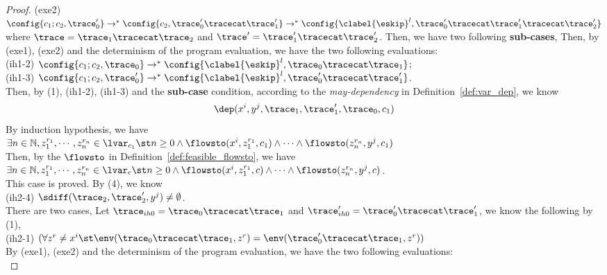 \begin{proof}
  (exe2) $\config{{c_1}; {c_2}, \trace_0'}
  \rightarrow^{*} \config{c_2, \trace_0'  \tracecat \trace_1'}
  \rightarrow^{*} \config{\clabel{\eskip}^l, \trace_0'  \tracecat \trace_1' \tracecat \trace_2'}$ 
  \\
  where $\trace = \trace_1 \tracecat \trace_2$ 
  and $\trace' = \trace_1' \tracecat \trace_2'$.
Then, we have two following \textbf{sub-cases},
Then, by (exe1), (exe2) and the determinism of the program evaluation, we have the two following evaluations:
\\
(ih1-2) $\config{c_1;c_2 , \trace_0} 
\rightarrow^{*} \config{\clabel{\eskip}^l, \trace_0  \tracecat \trace_1}$;
\\
(ih1-3) $\config{c_1;c_2, \trace_0'}
\rightarrow^{*} \config{\clabel{\eskip}^l, \trace_0'  \tracecat \trace_1'}$.
\\
Then, by (1), (ih1-2), (ih1-3) and the \textbf{sub-case} condition, 
according to the \emph{may-dependency} in Definition~\ref{def:var_dep}, we know
\[
  \dep(x^i, y^j, \trace_1, \trace_1', \trace_0, c_1)
\]
By induction hypothesis, we have 
\\
$\exists n \in \mathbb{N}, z_1^{r_1}, \cdots, z_n^{r_n} \in \lvar_{{c_1}} \st n \geq 0 \land
\flowsto(x^i,  z_1^{r_1}, c_1) 
\land \cdots \land \flowsto(z_n^{r_n}, y^j, c_1)$
\\
Then, by the $\flowsto$ in Definition~\ref{def:feasible_flowsto}, we have 
\\
$\exists n \in \mathbb{N}, z_1^{r_1}, \cdots, z_n^{r_n} \in \lvar_{{c}} \st n \geq 0 \land
\flowsto(x^i,  z_1^{r_1}, c) 
\land \cdots \land \flowsto(z_n^{r_n}, y^j, c)$.
\\
This case is proved.
By (4), we know 
\\
(ih2-4) $\sdiff(\trace_2, \trace_2', y^j ) \neq \emptyset$.
\\
There are two cases, 
%
Let $\trace_{ih0} = \trace_0 \tracecat \trace_1$ and $\trace_{ih0}' = \trace_0' \tracecat \trace_1'$, we know the following 
by (1),
\\
(ih2-1) 
$ (\forall z^r \neq x^i \st   
\env(\trace_0 \tracecat \trace_1, z^r ) =   \env(\trace_0' \tracecat \trace_1,z^r) )$
\\
By (exe1), (exe2) and the determinism of the program evaluation, we have the two following evaluations:
\\

\end{proof}
